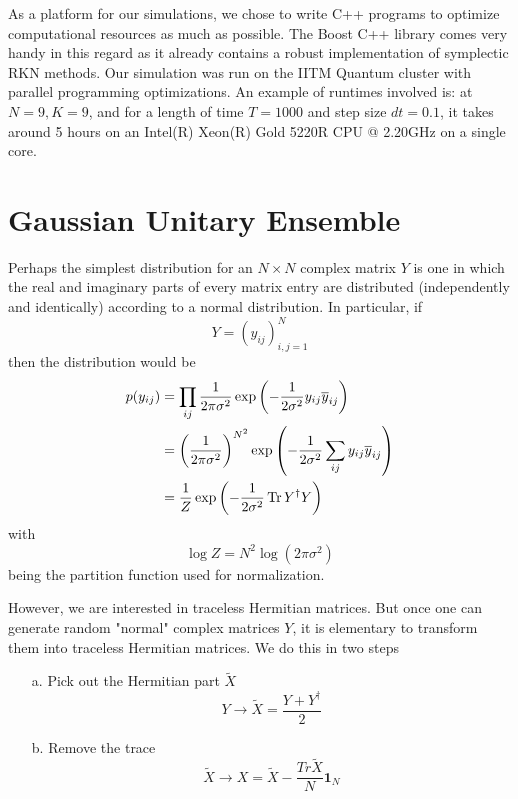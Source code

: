 As a platform for our simulations, we chose to write C++ programs to optimize computational resources as much as possible. The Boost C++ library \cite{schälingboost} comes very handy in this regard as it already contains a robust implementation of symplectic RKN methods. Our simulation was run on the IITM Quantum cluster with parallel programming optimizations. An example of runtimes involved is: at $N = 9, K = 9$, and for a length of time $T = 1000$ and step size $dt = 0.1$, it takes around 5 hours on an Intel(R) Xeon(R) Gold 5220R CPU @ 2.20GHz on a single core.



\chapter{Gaussian Unitary Ensemble}
\label{app:gue}

Perhaps the simplest distribution for an $N \times N$ complex matrix $Y$ is one in which the real and imaginary parts of every matrix entry are distributed (independently and identically) according to a normal distribution. In particular, if
\begin{equation}
  Y = (y_{i j})_{i, j = 1}^{N}
\end{equation}
then the distribution would be
\begin{equation}\label{eqn:complex-mat-dist}
  \begin{aligned}
    p(y_{i j}) &= \prod_{i j} \frac{1}{2\pi \sigma^2} \exp \left( -\frac{1}{2 \sigma^2} y_{i j} \overline{y}_{i j} \right) \\
    &= \left( \frac{1}{2\pi \sigma^2} \right)^{N^2} \exp \left( -\frac{1}{2 \sigma^2} \sum_{i j} y_{i j} \overline{y}_{i j} \right) \\
    &= \frac{1}{Z} \exp \left( -\frac{1}{2 \sigma^2} \Tr Y^\dagger Y \right)
  \end{aligned}
\end{equation}
with
\begin{equation}
  \log Z = N^2 \log(2 \pi \sigma^2)
\end{equation}
being the partition function used for normalization.

However, we are interested in traceless Hermitian matrices. But once one can generate random "normal" complex matrices $Y$, it is elementary to transform them into traceless Hermitian matrices. We do this in two steps
\begin{enumerate}
  \item[a.] {
    Pick out the Hermitian part $\tilde{X}$
    \begin{equation}
      Y \to \tilde{X} = \frac{Y + Y^{\dagger}}{2}
    \end{equation}
  }
  \item[b.] {
    Remove the trace
    \begin{equation}
      \tilde{X} \to X = \tilde{X} - \frac{Tr\tilde{X}}{N} \mathbf{1}_N
    \end{equation}
  }
\end{enumerate}

